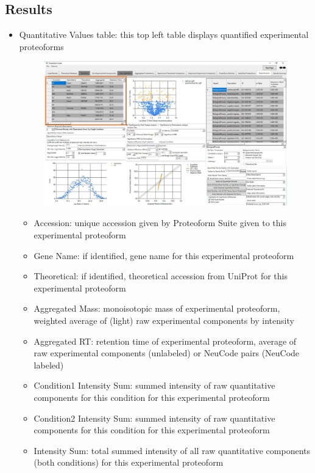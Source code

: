 \subsection{Results}
\begin{itemize}
\item Quantitative Values table: this top left table displays quantified experimental proteoforms
\begin{figure}[h]
\centering
\includegraphics[scale=0.43]{figures/quant2.jpg}
\end{figure}
\begin{itemize}
	\item Accession: unique accession given by Proteoform Suite given to this experimental proteoform
	\item Gene Name: if identified, gene name for this experimental proteoform
	\item Theoretical: if identified, theoretical accession from UniProt for this experimental proteoform
	\item Aggregated Mass: monoisotopic mass of experimental proteoform, weighted average of (light) raw experimental components by intensity
	\item Aggregated RT: retention time of experimental proteoform, average of raw experimental components (unlabeled) or NeuCode pairs (NeuCode labeled)
	\item Condition1 Intensity Sum: summed intensity of raw quantitative components for this condition for this experimental proteoform
	\item Condition2 Intensity Sum: summed intensity of raw quantitative components for this condition for this experimental proteoform
	\item Intensity Sum: total summed intensity of all raw quantitative components (both conditions) for this experimental proteoform

\end{itemize}
\end{itemize}
